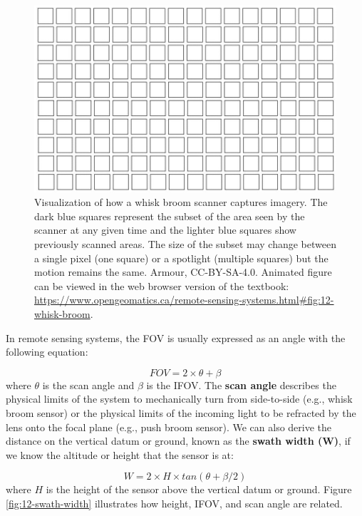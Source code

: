 \documentclass[
]{book}
\begin{document}
\begin{figure}
\includegraphics[width=0.75\linewidth]{images/12-whisk-broom-static} \caption{Visualization of how a whisk broom scanner captures imagery. The dark blue squares represent the subset of the area seen by the scanner at any given time and the lighter blue squares show previously scanned areas. The size of the subset may change between a single pixel (one square) or a spotlight (multiple squares) but the motion remains the same. Armour, CC-BY-SA-4.0. Animated figure can be viewed in the web browser version of the textbook: \url{https://www.opengeomatics.ca/remote-sensing-systems.html\#fig:12-whisk-broom}.}\label{fig:12-whisk-broom}
\end{figure}

In remote sensing systems, the FOV is usually expressed as an angle with the following equation:

\[
FOV = 2 × θ + β
\]
where \(θ\) is the scan angle and \(β\) is the IFOV. The \textbf{scan angle} describes the physical limits of the system to mechanically turn from side-to-side (e.g., whisk broom sensor) or the physical limits of the incoming light to be refracted by the lens onto the focal plane (e.g., push broom sensor). We can also derive the distance on the vertical datum or ground, known as the \textbf{swath width (W)}, if we know the altitude or height that the sensor is at:

\[
W = 2 × H × tan(θ + β/2) 
\]
where \(H\) is the height of the sensor above the vertical datum or ground. Figure \ref{fig:12-swath-width} illustrates how height, IFOV, and scan angle are related.
\end{document}
